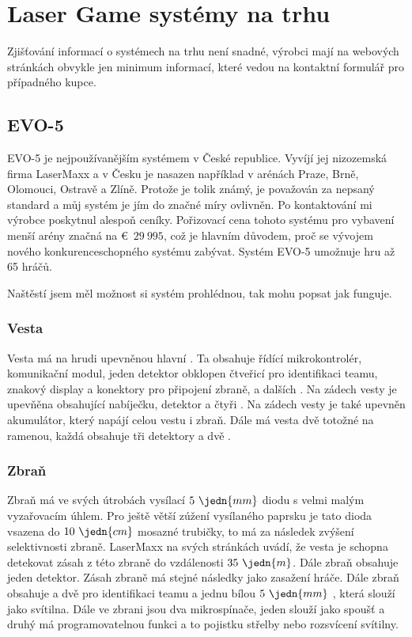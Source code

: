 \section{Laser Game systémy na trhu}
Zjišťování informací o systémech na trhu není snadné, výrobci mají na webových stránkách obvykle jen minimum informací, které vedou na kontaktní formulář pro případného kupce.

\subsection{EVO-5}

EVO-5 je nejpoužívanějším  systémem v České republice. Vyvíjí jej nizozemská firma LaserMaxx a v Česku je nasazen například v arénách Praze, Brně, Olomouci, Ostravě a Zlíně. Protože je tolik známý, je považován za nepsaný standard a můj systém je jím do značné míry ovlivněn. Po kontaktování mi výrobce poskytnul alespoň ceníky. Pořizovací cena tohoto systému pro vybavení menší arény značná na €~$29~995$, což je hlavním důvodem, proč se vývojem nového konkurenceschopného systému zabývat. Systém EVO-5 umožnuje hru až 65 hráčů.

Naštěstí jsem měl možnost si systém prohlédnou, tak mohu popsat jak funguje.

\subsubsection{Vesta}
Vesta má na hrudi upevněnou hlavní . Ta obsahuje řídící mikrokontrolér, komunikační  modul, jeden  detektor obklopen čtveřicí   pro identifikaci teamu, znakový display a konektory pro připojení zbraně, a dalších . Na zádech vesty je upevňěna  obsahující nabíječku,  detektor a čtyři  . Na zádech vesty je také upevněn akumulátor, který napájí celou vestu i zbraň. Dále má vesta dvě totožné  na ramenou, každá obsahuje tři  detektory a dvě  .

\subsubsection{Zbraň}
Zbraň má ve svých útrobách vysílací $5~\jedn{mm}$   diodu s velmi malým vyzařovacím úhlem. Pro ještě větší zúžení vysílaného paprsku je tato dioda vsazena do $10~\jedn{cm}$ mosazné trubičky, to má za následek zvýšení selektivnosti zbraně. LaserMaxx na svých stránkách uvádí, že vesta je schopna detekovat zásah z této zbraně do vzdálenosti $35~\jedn{m}$. Dále zbraň obsahuje jeden  detektor. Zásah zbraně má stejné následky jako zasažení hráče. Dále zbraň obsahuje a dvě   pro identifikaci teamu a jednu bílou $5~\jedn{mm}$ , která slouží jako svítilna. Dále ve zbrani jsou dva mikrospínače, jeden slouží jako spoušť a druhý má programovatelnou funkci a to pojistku střelby nebo rozsvícení svítilny.

